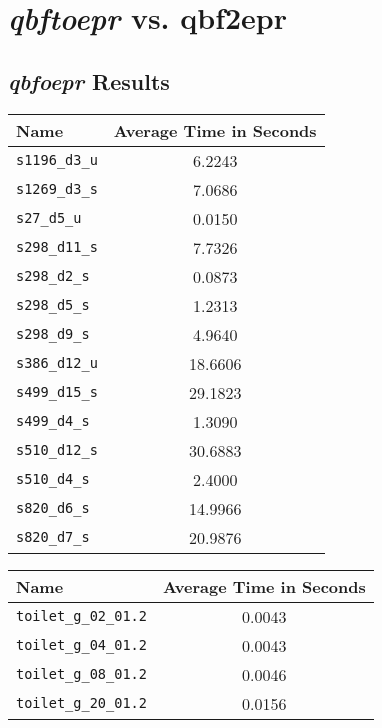 \chapter{\textit{qbftoepr} vs. qbf2epr} \label{qbftoeprvsqbf2epr}

\section{\textit{qbfoepr} Results}

\begin{center}
\begin{tabular}{| l | S[table-format=3.2] |}
\hline
\textbf{Name} & \textbf{Average Time in Seconds} \\ \hline
\texttt{s1196\_d3\_u} & 6.2243 \\
\texttt{s1269\_d3\_s} & 7.0686 \\
\texttt{s27\_d5\_u} & 0.0150 \\
\texttt{s298\_d11\_s} & 7.7326 \\
\texttt{s298\_d2\_s} & 0.0873 \\
\texttt{s298\_d5\_s} & 1.2313 \\
\texttt{s298\_d9\_s} & 4.9640 \\
\texttt{s386\_d12\_u} & 18.6606 \\
\texttt{s499\_d15\_s} & 29.1823 \\
\texttt{s499\_d4\_s} & 1.3090 \\
\texttt{s510\_d12\_s} & 30.6883 \\
\texttt{s510\_d4\_s} & 2.4000 \\
\texttt{s820\_d6\_s} & 14.9966 \\
\texttt{s820\_d7\_s} & 20.9876 \\
\hline
\end{tabular}
\end{center}

\begin{center}
\begin{tabular}{| l | S[table-format=3.2] |}
\hline
\textbf{Name} & \textbf{Average Time in Seconds} \\ \hline
\texttt{toilet\_g\_02\_01.2} & 0.0043 \\
\texttt{toilet\_g\_04\_01.2} & 0.0043 \\
\texttt{toilet\_g\_08\_01.2} & 0.0046 \\
\texttt{toilet\_g\_20\_01.2} & 0.0156 \\
\hline
\end{tabular}
\end{center}

